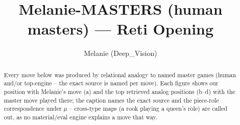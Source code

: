 \documentclass[11pt]{article}
\title{Melanie-MASTERS (human masters) — Reti Opening}
\author{Melanie (Deep\_Vision)}
\date{}
\begin{document}
\maketitle

\begin{abstract}Every move below was produced by relational analogy to named master games (human and/or top-engine -- the exact source is named per move). Each figure shows our position with Melanie's move (a) and the top retrieved analog positions (b--d) with the master move played there; the caption names the exact source and the piece-role correspondence under $\mu$ -- cross-type maps (a rook playing a queen's role) are called out, as no material/eval engine explains a move that way.\end{abstract}

\begin{figure}[p]\centering
\begin{subfigure}{0.46\textwidth}\centering
\resizebox{\linewidth}{!}{%
\newchessgame
\chessboard[
  setfen={rnbq1rk1/pp2bppp/4pn2/2pp4/2P5/1P3NP1/P2PPPBP/RNBQ1RK1 w - - 0 7},
  showmover=false,
  pgfstyle=straightmove, color=movearrow, markmove={a2-a3}
]}
\caption{}
\end{subfigure}\hfill
\begin{subfigure}{0.46\textwidth}\centering
\resizebox{\linewidth}{!}{%
\newchessgame
\chessboard[
  setfen={r1bq1rk1/p1pn1ppp/1ppb4/4p3/3PP3/2P1BN2/PP3PPP/RN1Q1RK1 w - - 1 11},
  showmover=false,
  pgfstyle=straightmove, color=movearrow, markmove={b1-d2}
]}
\caption{}
\end{subfigure}
\\[4pt]
\begin{subfigure}{0.46\textwidth}\centering
\resizebox{\linewidth}{!}{%
\newchessgame
\chessboard[
  setfen={rn1q1rk1/1p2bpp1/p3bn1p/2pp4/3P4/1PN2NP1/PB2PPBP/R2Q1RK1 w - - 2 11},
  showmover=false,
  pgfstyle=straightmove, color=movearrow, markmove={a1-c1}
]}
\caption{}
\end{subfigure}\hfill


\end{figure}
\end{document}
